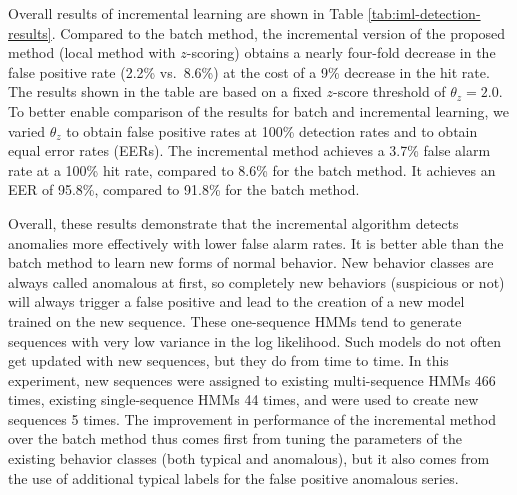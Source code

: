 Overall results of incremental learning are shown in Table
\ref{tab:iml-detection-results}. Compared to the batch method, the
incremental version of the proposed method (local method with
$z$-scoring) obtains a nearly four-fold decrease in the false positive
rate (2.2\% vs.\ 8.6\%) at the cost of a 9\% decrease in the hit rate.
The results shown in the table are based on a fixed $z$-score
threshold of $\theta_z=2.0$.  To better enable comparison of the
results for batch and incremental learning, we varied $\theta_z$ to
obtain false positive rates at 100\% detection rates and to obtain
equal error rates (EERs). The incremental method achieves a 3.7\%
false alarm rate at a 100\% hit rate, compared to 8.6\% for the batch
method.  It achieves an EER of 95.8\%, compared to 91.8\% for the
batch method.

Overall, these results demonstrate that the incremental algorithm
detects anomalies more effectively with lower false alarm rates.  It
is better able than the batch method to learn new forms of normal
behavior.  New behavior classes are always called anomalous at first,
so completely new behaviors (suspicious or not) will always trigger a
false positive and lead to the creation of a new model trained on the
new sequence.  These one-sequence HMMs tend to generate sequences with
very low variance in the log likelihood. Such models do not often get
updated with new sequences, but they do from time to time. In this
experiment, new sequences were assigned to existing multi-sequence
HMMs 466 times, existing single-sequence HMMs 44 times, and were used
to create new sequences 5 times.  The improvement in performance of
the incremental method over the batch method thus comes first from
tuning the parameters of the existing behavior classes (both typical
and anomalous), but it also comes from the use of additional typical
labels for the false positive anomalous series.

